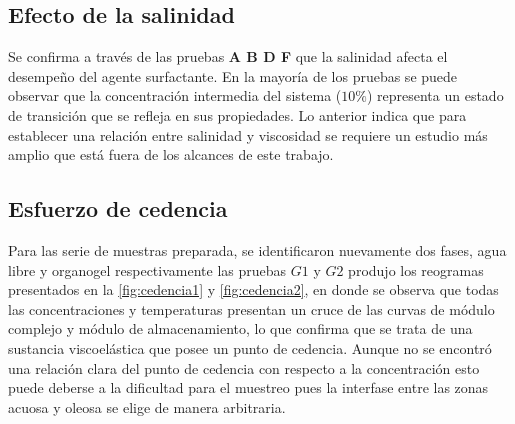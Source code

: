 \subsection{Efecto de la salinidad}

%
%
%
%

Se confirma a través de las pruebas \textbf{A B D F} que la salinidad afecta el desempeño del agente surfactante. En la mayoría de los pruebas se puede observar que la concentración intermedia del sistema ($10\%$) representa un estado de transición que se refleja en sus propiedades. Lo anterior indica que para establecer una relación entre salinidad y viscosidad se requiere un estudio más amplio que está fuera de los alcances de este trabajo.


\subsection{Esfuerzo de cedencia}

Para las serie de muestras preparada, se identificaron nuevamente dos fases, agua libre y organogel respectivamente las pruebas $G1$ y $G2$ produjo los reogramas presentados en la \autoref{fig:cedencia1} y \autoref{fig:cedencia2}, en donde se observa que todas las concentraciones y temperaturas presentan un cruce de las curvas de módulo complejo y módulo de almacenamiento, lo que confirma que se trata de una sustancia viscoelástica que posee un punto de cedencia. Aunque no se encontró una relación clara del punto de cedencia con respecto a la concentración esto puede deberse a la dificultad para el muestreo pues la interfase entre las zonas acuosa y oleosa se elige de manera arbitraria.

